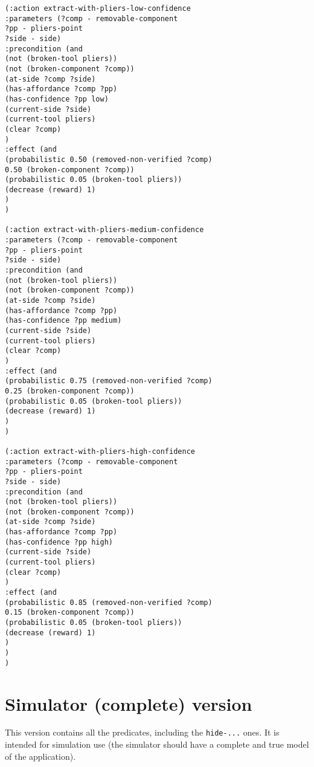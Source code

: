 \documentclass[../root.tex]{subfiles}
\begin{document}
\begin{lstlisting}
(:action extract-with-pliers-low-confidence
:parameters (?comp - removable-component
?pp - pliers-point
?side - side)
:precondition (and
(not (broken-tool pliers))
(not (broken-component ?comp))
(at-side ?comp ?side)
(has-affordance ?comp ?pp)
(has-confidence ?pp low)
(current-side ?side)
(current-tool pliers)
(clear ?comp)
)
:effect (and
(probabilistic 0.50 (removed-non-verified ?comp)
0.50 (broken-component ?comp))
(probabilistic 0.05 (broken-tool pliers))
(decrease (reward) 1)
)
)

(:action extract-with-pliers-medium-confidence
:parameters (?comp - removable-component
?pp - pliers-point
?side - side)
:precondition (and
(not (broken-tool pliers))
(not (broken-component ?comp))
(at-side ?comp ?side)
(has-affordance ?comp ?pp)
(has-confidence ?pp medium)
(current-side ?side)
(current-tool pliers)
(clear ?comp)
)
:effect (and
(probabilistic 0.75 (removed-non-verified ?comp)
0.25 (broken-component ?comp))
(probabilistic 0.05 (broken-tool pliers))
(decrease (reward) 1)
)
)

(:action extract-with-pliers-high-confidence
:parameters (?comp - removable-component
?pp - pliers-point
?side - side)
:precondition (and
(not (broken-tool pliers))
(not (broken-component ?comp))
(at-side ?comp ?side)
(has-affordance ?comp ?pp)
(has-confidence ?pp high)
(current-side ?side)
(current-tool pliers)
(clear ?comp)
)
:effect (and
(probabilistic 0.85 (removed-non-verified ?comp)
0.15 (broken-component ?comp))
(probabilistic 0.05 (broken-tool pliers))
(decrease (reward) 1)
)
)
)

\end{lstlisting}

\section{Simulator (complete) version}

This version contains all the predicates, including the \texttt{hide-...}
ones. It is intended for simulation use (the simulator should have
a complete and true model of the application).
\end{document}
